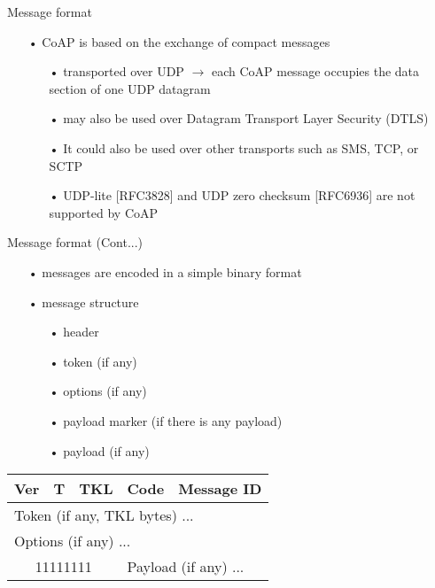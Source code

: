 \documentclass[11pt]{beamer}
\begin{document}
\begin{frame}{Message format}
\begin{itemize}
\item[•] CoAP is based on the exchange of compact messages
\begin{itemize}
\item[•] transported over UDP $\rightarrow$ each CoAP message occupies the data section of one UDP datagram
\item[•] may also be used over Datagram Transport Layer Security (DTLS)
\item[•] It could also be used over other transports such as SMS, TCP, or SCTP
\item[•] UDP-lite [RFC3828] and UDP zero checksum [RFC6936] are not supported by CoAP
\end{itemize}
\end{itemize}
\end{frame}
\begin{frame}{Message format (Cont...)}
\begin{itemize}
\item[•] messages are encoded in a simple binary format
\item[•] message structure
\begin{itemize}
\item[•] header
\item[•] token (if any)
\item[•] options (if any)
\item[•] payload marker (if there is any payload)
\item[•] payload (if any)
\end{itemize}
\end{itemize}
\begin{center}
  \begin{tabular}{*{32}{c}}
    \hline
    \multicolumn{2}{|c|}{{\scriptsize Ver}} & \multicolumn{2}{|c|}{\scriptsize T} & \multicolumn{4}{|c|}{\scriptsize TKL} & \multicolumn{8}{|c|}{\scriptsize Code} & \multicolumn{16}{|c|}{\scriptsize Message ID} \\ \hline
    \multicolumn{32}{|l}{\scriptsize Token (if any, TKL bytes) ...} \\ \hline
    \multicolumn{32}{|l}{\scriptsize Options (if any) ...} \\ \hline
    \multicolumn{8}{|c|}{\scriptsize 11111111} & \multicolumn{24}{|l}{\scriptsize Payload (if any) ...} \\ \hline 
  \end{tabular}
\end{center}
\end{frame}
\end{document}
